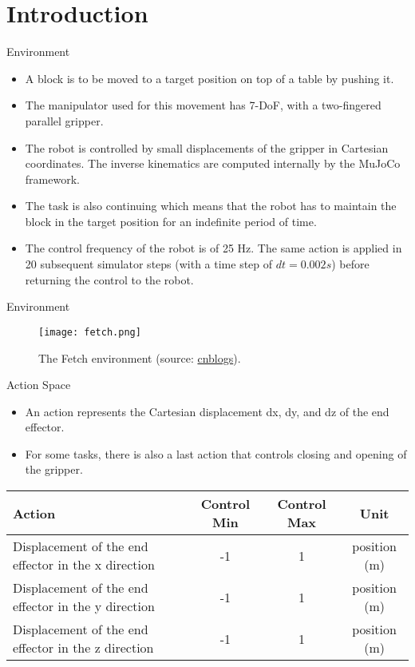 \section{Introduction}

\begin{frame}{Environment}
    \begin{itemize}
        \item A block is to be moved to a target position on top of a table by pushing it.
        \item The manipulator used for this movement has 7-DoF, with a two-fingered parallel gripper.
        \item The robot is controlled by small displacements of the gripper in Cartesian coordinates. The inverse kinematics are computed internally by the MuJoCo framework.
        \item The task is also continuing which means that the robot has to maintain the block in the target position for an indefinite period of time.
        \item The control frequency of the robot is of 25 Hz. The same action is applied in 20 subsequent simulator steps (with a time step of $dt = 0.002 s$) before returning the control to the robot.
    \end{itemize}
\end{frame}

\begin{frame}{Environment}
    \begin{figure}
        \centering
        \texttt{[image: fetch.png]}
        \caption{The Fetch environment (source: \href{https://www.cnblogs.com/siahekai/p/14161023.html}{cnblogs}).}
    \end{figure}
\end{frame}

\begin{frame}{Action Space}
    \vfill
    \begin{itemize}
        \item An action represents the Cartesian displacement dx, dy, and dz of the end effector.
        \item For some tasks, there is also a last action that controls closing and opening of the gripper.
    \end{itemize}
    \vfill
    \begin{tabular}{|l|c|c|c|}
        \hline
        Action & Control Min & Control Max & Unit \\
        \hline
        Displacement of the end effector in the x direction & -1 & 1 & position (m) \\
        \hline
        Displacement of the end effector in the y direction & -1 & 1 & position (m) \\
        \hline
        Displacement of the end effector in the z direction & -1 & 1 & position (m) \\
        \hline
    \end{tabular}
    \vfill
\end{frame}

